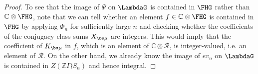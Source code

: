 \begin{proof}
To see that the image of $\Psi$ on $\LambdaG$ is contained in $\FHG$ rather than $\mathbb{C}\otimes \FHG$, note that we can tell whether an element $f \in \mathbb{C} \otimes \FHG$ is contained in $\FHG$ by applying $\Phi_n$ for sufficiently large $n$ and checking whether the coefficients of the conjugacy class sums $X_{\bs\mu}$ are integers. This would imply that the coefficient of $K_{\bs\mu}$ in $f$, which is an element of $\mathbb{C} \otimes \mathcal{R}$, is integer-valued, i.e. an element of $\mathcal{R}$. On the other hand, we already know the image of $ev_n$ on $\LambdaG$ is contained in $Z(\mathbb{Z}\Gamma \wr S_n)$ and hence integral.

\end{proof}
